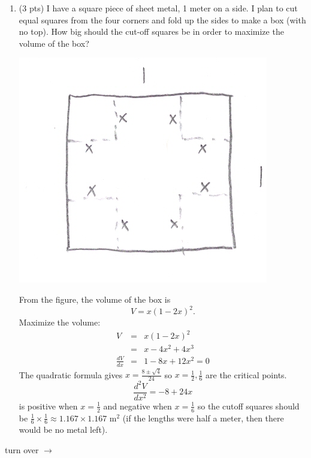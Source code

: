 \documentclass[11pt,letterpaper]{article}
\begin{document}
\begin{enumerate}
\begin{enumerate}
\vspace{1pc}
\item (3 pts) I have a square piece of sheet metal, 1 meter on a
side. I plan to cut
equal squares from the four corners and fold up the
sides to make a box (with no
top). How big
should the cut-off squares be in order to maximize the
volume of the
box?  

\vspace{.5pc}
\begin{center}
 \includegraphics[scale=.2]{./q8solpic0001.jpg}
\end{center}

From the figure, the volume of the box is
\[V=x(1-2x)^2.\]
Maximize the volume:
\begin{eqnarray*}
 V &=& x(1-2x)^2 \\
&=& x-4x^2+4x^3 \\
\frac{dV}{dx} &=& 1-8x+12x^2=0
\end{eqnarray*}
The quadratic formula gives $x=\frac{8\pm \sqrt{4}}{24}$ so $x=\frac{1}{2},\frac{1}{6}$ are the critical points.
\[\frac{d^2V}{dx^2}=-8+24x\]
is positive when $x=\frac{1}{2}$ and negative when $x=\frac{1}{6}$ so the cutoff squares should be $\frac{1}{6}\times \frac{1}{6}\approx 1.167 \times 1.167$ m$^2$ (if the lengths were half a meter, then there would be no metal left).

\end{enumerate}

\vspace{1pc}
\begin{flushright}
 turn over $\rightarrow $
\end{flushright}


\end{enumerate}
\end{document}

